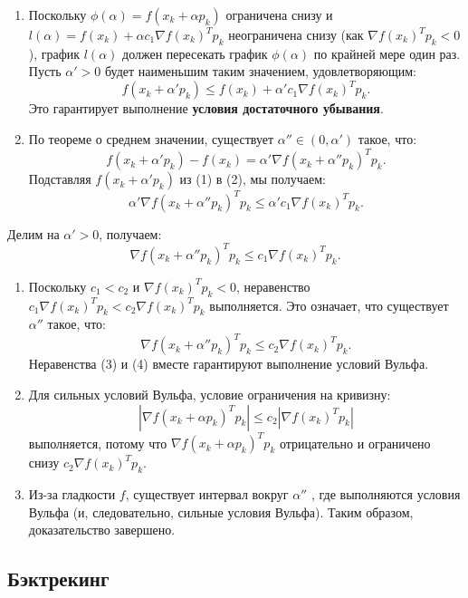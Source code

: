 \documentclass[
  russian,
  letterpaper,
  DIV=11,
  numbers=noendperiod]{scrartcl}
\begin{document}
\begin{enumerate}
\def\labelenumi{\arabic{enumi}.}
\item
  Поскольку \(\phi(\alpha) = f(x_k + \alpha p_k)\) ограничена снизу и
  \(l(\alpha) = f(x_k) + \alpha c_1 \nabla f(x_k)^T p_k\) неограничена
  снизу (как \(\nabla f(x_k)^T p_k < 0\)), график \(l(\alpha)\) должен
  пересекать график \(\phi(\alpha)\) по крайней мере один раз. Пусть
  \(\alpha' > 0\) будет наименьшим таким значением, удовлетворяющим: \[
  f(x_k + \alpha' p_k) \leq f(x_k) + \alpha' c_1 \nabla f(x_k)^T p_k. \tag{1}
  \] Это гарантирует выполнение \textbf{условия достаточного убывания}.
\item
  По теореме о среднем значении, существует
  \(\alpha'' \in (0, \alpha')\) такое, что: \[
  f(x_k + \alpha' p_k) - f(x_k) = \alpha' \nabla f(x_k + \alpha'' p_k)^T p_k. \tag{2}
  \] Подставляя \(f(x_k + \alpha' p_k)\) из (1) в (2), мы получаем: \[
  \alpha' \nabla f(x_k + \alpha'' p_k)^T p_k \leq \alpha' c_1 \nabla f(x_k)^T p_k.
  \]
\end{enumerate}

Делим на \(\alpha' > 0\), получаем: \[
\nabla f(x_k + \alpha'' p_k)^T p_k \leq c_1 \nabla f(x_k)^T p_k. \tag{3}
\]

\begin{enumerate}
\def\labelenumi{\arabic{enumi}.}
\setcounter{enumi}{2}
\item
  Поскольку \(c_1 < c_2\) и \(\nabla f(x_k)^T p_k < 0\), неравенство
  \(c_1 \nabla f(x_k)^T p_k < c_2 \nabla f(x_k)^T p_k\) выполняется. Это
  означает, что существует \(\alpha''\) такое, что: \[
  \nabla f(x_k + \alpha'' p_k)^T p_k \leq c_2 \nabla f(x_k)^T p_k. \tag{4}
  \] Неравенства (3) и (4) вместе гарантируют выполнение условий Вульфа.
\item
  Для сильных условий Вульфа, условие ограничения на кривизну: \[
  \left| \nabla f(x_k + \alpha p_k)^T p_k \right| \leq c_2 \left| \nabla f(x_k)^T p_k \right| \tag{5}
  \] выполняется, потому что \(\nabla f(x_k + \alpha p_k)^T p_k\)
  отрицательно и ограничено снизу \(c_2 \nabla f(x_k)^T p_k\).
\item
  Из-за гладкости \(f\), существует интервал вокруг \(\alpha''\) , где
  выполняются условия Вульфа (и, следовательно, сильные условия Вульфа).
  Таким образом, доказательство завершено.
\end{enumerate}

\subsection{Бэктрекинг}\label{ux431ux44dux43aux442ux440ux435ux43aux438ux43dux433}
\end{document}
